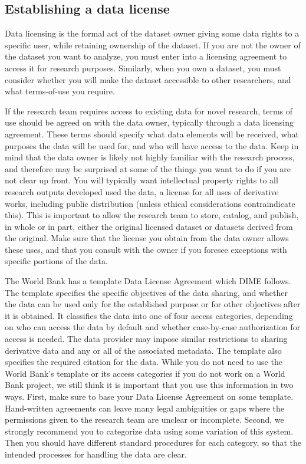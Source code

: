 \subsection{Establishing a data license}

Data licensing
is the formal act of the dataset owner
giving some data rights to a specific user,
while retaining ownership of the dataset.
If you are not the owner of the dataset you want to analyze,
you must enter into a licensing agreement to access it for research purposes.
Similarly, when you own a dataset,
you must consider whether you will make the dataset accessible to other researchers,
and what terms-of-use you require.

If the research team requires access to existing data for novel research,
terms of use should be agreed on with the data owner,
typically through a data licensing agreement.
These terms should specify what data elements will be received,
what purposes the data will be used for, and who will have access to the data.
Keep in mind that the data owner is likely not highly familiar
with the research process, and therefore may be surprised
at some of the things you want to do if you are not clear up front.
You will typically want intellectual property rights to all research outputs developed used the data,
a license for all uses of derivative works, including public distribution
(unless ethical considerations contraindicate this).
This is important to allow the research team to store, catalog, and publish, in whole or in part,
either the original licensed dataset or datasets derived from the original.
Make sure that the license you obtain from the data owner allows these uses,
and that you consult with the owner
if you foresee exceptions with specific portions of the data.

The World Bank has a template Data License Agreement which DIME follows.
The template specifies the specific objectives of the data sharing,
and whether the data can be used only for the established purpose
or for other objectives after it is obtained.
It classifies the data into one of four access categories,
depending on who can access the data by default
and whether case-by-case authorization for access is needed.
The data provider may impose similar restrictions
to sharing derivative data and any or all of the associated metadata.
The template also specifies the required citation for the data.
While you do not need to use the World Bank's template
or its access categories if you do not work on a World Bank project,
we still think it is important that you use this information in two ways.
First, make sure to base your Data License Agreement on some template.
Hand-written agreements can leave many legal ambiguities or gaps
where the permissions given to the research team are unclear or incomplete.
Second, we strongly recommend you to categorize data using some variation of this system.
Then you should have different standard procedures for each category,
so that the intended processes for handling the data are clear.


